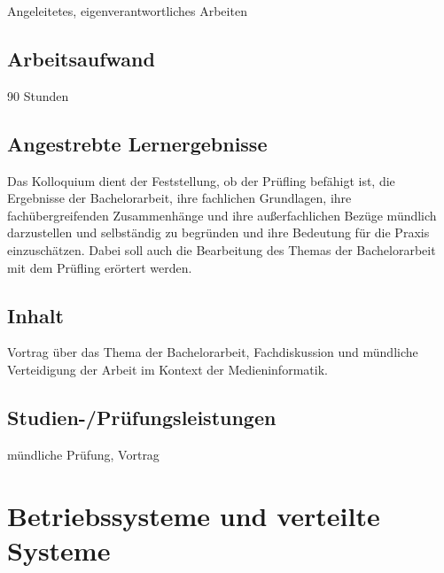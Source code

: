 Angeleitetes, eigenverantwortliches Arbeiten

\section*{Arbeitsaufwand\label{/mi-2017/modulbeschreibungen-bachelor/BA_Bachelorkolloquium}}\label{arbeitsaufwandpathlabelmi-2017modulbeschreibungen-bachelorbaux5fbachelorkolloquium}

90 Stunden

\section*{Angestrebte
Lernergebnisse\label{/mi-2017/modulbeschreibungen-bachelor/BA_Bachelorkolloquium}}\label{angestrebte-lernergebnissepathlabelmi-2017modulbeschreibungen-bachelorbaux5fbachelorkolloquium}

Das Kolloquium dient der Feststellung, ob der Prüfling befähigt ist, die
Ergebnisse der Bachelorarbeit, ihre fachlichen Grundlagen, ihre
fachübergreifenden Zusammenhänge und ihre außerfachlichen Bezüge
mündlich darzustellen und selbständig zu begründen und ihre Bedeutung
für die Praxis einzuschätzen. Dabei soll auch die Bearbeitung des Themas
der Bachelorarbeit mit dem Prüfling erörtert werden.

\section*{Inhalt\label{/mi-2017/modulbeschreibungen-bachelor/BA_Bachelorkolloquium}}\label{inhaltpathlabelmi-2017modulbeschreibungen-bachelorbaux5fbachelorkolloquium}

Vortrag über das Thema der Bachelorarbeit, Fachdiskussion und mündliche
Verteidigung der Arbeit im Kontext der Medieninformatik.

\section*{Studien-/Prüfungsleistungen\label{/mi-2017/modulbeschreibungen-bachelor/BA_Bachelorkolloquium}}\label{studien-pruxfcfungsleistungenpathlabelmi-2017modulbeschreibungen-bachelorbaux5fbachelorkolloquium}

mündliche Prüfung, Vortrag

\chapter{Betriebssysteme und verteilte
Systeme\label{/mi-2017/modulbeschreibungen-bachelor/BA_betriebssysteme-und-verteile-systeme}}\label{betriebssysteme-und-verteilte-systemepathlabelmi-2017modulbeschreibungen-bachelorbaux5fbetriebssysteme-und-verteile-systeme}

